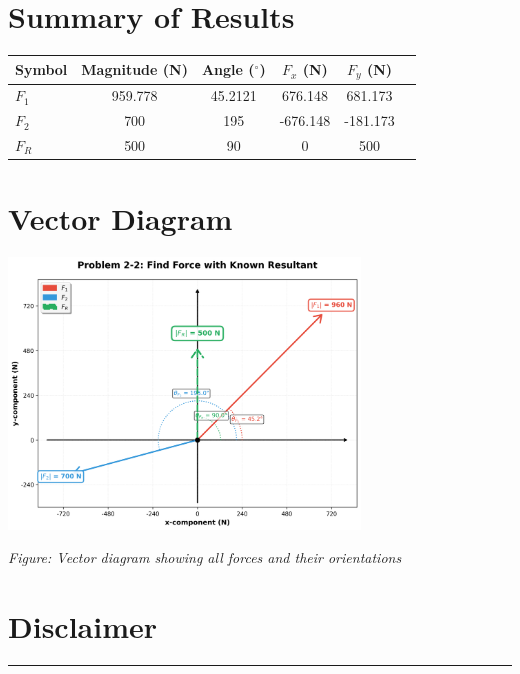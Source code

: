 \documentclass[11pt,a4paper]{article}
\begin{document}
\section{Summary of Results}

\begin{longtable}{lSSSSS}
\toprule
Symbol & {Magnitude (N)} & {Angle ($^\circ$)} & {$F_x$ (N)} & {$F_y$ (N)} \\
\midrule
\endhead
$F_{1}$ & 959.778 & 45.2121 & 676.148 & 681.173 \\
$F_{2}$ & 700 & 195 & -676.148 & -181.173 \\
$F_{R}$ & 500 & 90 & 0 & 500 \\
\bottomrule
\end{longtable}

\section{Vector Diagram}

\begin{center}
\includegraphics[width=0.7\textwidth]{Problem_2-2_Find_Force_with_Known_Resultant_diagram.png}
\end{center}

\begin{center}
\textit{Figure: Vector diagram showing all forces and their orientations}
\end{center}


\clearpage

\section*{Disclaimer}

\begin{center}
\rule{\textwidth}{0.4pt}
\end{center}
\end{document}
